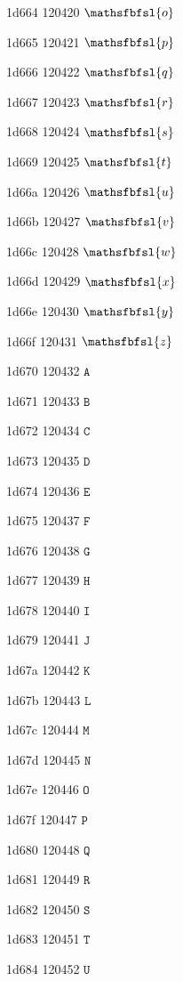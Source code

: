 \documentclass[11pt]{article}
\begin{document}
1d664 120420 \ensuremath{\mathsfbfsl{o}}

1d665 120421 \ensuremath{\mathsfbfsl{p}}

1d666 120422 \ensuremath{\mathsfbfsl{q}}

1d667 120423 \ensuremath{\mathsfbfsl{r}}

1d668 120424 \ensuremath{\mathsfbfsl{s}}

1d669 120425 \ensuremath{\mathsfbfsl{t}}

1d66a 120426 \ensuremath{\mathsfbfsl{u}}

1d66b 120427 \ensuremath{\mathsfbfsl{v}}

1d66c 120428 \ensuremath{\mathsfbfsl{w}}

1d66d 120429 \ensuremath{\mathsfbfsl{x}}

1d66e 120430 \ensuremath{\mathsfbfsl{y}}

1d66f 120431 \ensuremath{\mathsfbfsl{z}}

1d670 120432 \ensuremath{\mathtt{A}}

1d671 120433 \ensuremath{\mathtt{B}}

1d672 120434 \ensuremath{\mathtt{C}}

1d673 120435 \ensuremath{\mathtt{D}}

1d674 120436 \ensuremath{\mathtt{E}}

1d675 120437 \ensuremath{\mathtt{F}}

1d676 120438 \ensuremath{\mathtt{G}}

1d677 120439 \ensuremath{\mathtt{H}}

1d678 120440 \ensuremath{\mathtt{I}}

1d679 120441 \ensuremath{\mathtt{J}}

1d67a 120442 \ensuremath{\mathtt{K}}

1d67b 120443 \ensuremath{\mathtt{L}}

1d67c 120444 \ensuremath{\mathtt{M}}

1d67d 120445 \ensuremath{\mathtt{N}}

1d67e 120446 \ensuremath{\mathtt{O}}

1d67f 120447 \ensuremath{\mathtt{P}}

1d680 120448 \ensuremath{\mathtt{Q}}

1d681 120449 \ensuremath{\mathtt{R}}

1d682 120450 \ensuremath{\mathtt{S}}

1d683 120451 \ensuremath{\mathtt{T}}

1d684 120452 \ensuremath{\mathtt{U}}
\end{document}
